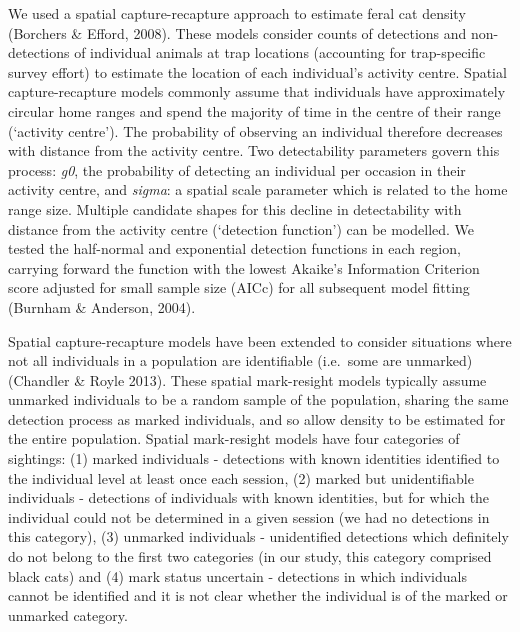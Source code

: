 \documentclass[]{elsarticle} %
\begin{document}
We used a spatial capture-recapture approach to estimate feral cat density (Borchers \& Efford, 2008). These models consider counts of detections and non-detections of individual animals at trap locations (accounting for trap-specific survey effort) to estimate the location of each individual's activity centre. Spatial capture-recapture models commonly assume that individuals have approximately circular home ranges and spend the majority of time in the centre of their range (`activity centre'). The probability of observing an individual therefore decreases with distance from the activity centre. Two detectability parameters govern this process: \emph{g0}, the probability of detecting an individual per occasion in their activity centre, and \emph{sigma}: a spatial scale parameter which is related to the home range size. Multiple candidate shapes for this decline in detectability with distance from the activity centre (`detection function') can be modelled. We tested the half-normal and exponential detection functions in each region, carrying forward the function with the lowest Akaike's Information Criterion score adjusted for small sample size (AICc) for all subsequent model fitting (Burnham \& Anderson, 2004).

Spatial capture-recapture models have been extended to consider situations where not all individuals in a population are identifiable (i.e.~some are unmarked) (Chandler \& Royle 2013). These spatial mark-resight models typically assume unmarked individuals to be a random sample of the population, sharing the same detection process as marked individuals, and so allow density to be estimated for the entire population. Spatial mark-resight models have four categories of sightings: (1) marked individuals - detections with known identities identified to the individual level at least once each session, (2) marked but unidentifiable individuals - detections of individuals with known identities, but for which the individual could not be determined in a given session (we had no detections in this category), (3) unmarked individuals - unidentified detections which definitely do not belong to the first two categories (in our study, this category comprised black cats) and (4) mark status uncertain - detections in which individuals cannot be identified and it is not clear whether the individual is of the marked or unmarked category.
\end{document}
